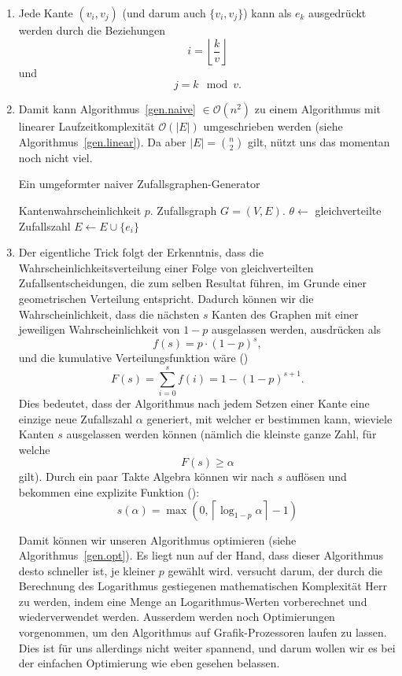 \documentclass[11pt,abstracton]{scrreprt} %
\theoremstyle{definition}
\begin{document}
\begin{enumerate}
\item Jede Kante $(v_i, v_j)$ (und darum auch $\{v_i, v_j\}$) kann als $e_k$ ausgedrückt werden durch die Beziehungen
\[
i = \left\lfloor\frac k v \right\rfloor
\]
und
\[
j = k \mod v.
\]

\item Damit kann Algorithmus~\ref{gen.naive} $\in \mathcal{O}(n^2)$ zu einem Algorithmus mit linearer Laufzeitkomplexität $\mathcal{O}(|E|)$ umgeschrieben werden (siehe Algorithmus~\ref{gen.linear}). Da aber $|E| = \binom{n}{2}$ gilt, nützt uns das momentan noch nicht viel.

\begin{algorithm}
\caption{Ein umgeformter naiver Zufallsgraphen-Generator}
\label{gen.linear}
\begin{algorithmic}
\Require
	\Statex Kantenwahrscheinlichkeit $p$.
\Ensure
	\Statex Zufallsgraph $G = (V, E)$.
\Statex
{}
\State $\theta\gets$ gleichverteilte Zufallszahl
\State $E \gets E \cup \{e_i\}$
\EndIf
\EndFor
\end{algorithmic}
\end{algorithm}

\item Der eigentliche Trick folgt der Erkenntnis, dass die Wahrscheinlichkeitsverteilung einer Folge von gleichverteilten Zufallsentscheidungen, die zum selben Resultat führen, im Grunde einer geometrischen Verteilung entspricht. Dadurch können wir die Wahrscheinlichkeit, dass die nächsten $s$ Kanten des Graphen mit einer jeweiligen Wahrscheinlichkeit von $1-p$ ausgelassen werden, ausdrücken als
\[
	f(s) = p \cdot (1-p)^s,
\]
und die kumulative Verteilungsfunktion wäre (\cite{fastalgo})
\[
	F(s) = \sum\limits_{i=0}^s f(i) = 1 - (1-p)^{s+1}.
\]
Dies bedeutet, dass der Algorithmus nach jedem Setzen einer Kante eine einzige neue Zufallszahl $\alpha$ generiert, mit welcher er bestimmen kann, wieviele Kanten $s$ ausgelassen werden können (nämlich die kleinste ganze Zahl, für welche
\[
F(s) \ge \alpha
\]
gilt). Durch ein paar Takte Algebra können wir nach $s$ auflösen und bekommen eine explizite Funktion (\cite{fastalgo}):
\[
	s(\alpha) = \max(0, \left\lceil \log_{1-p}\alpha\right\rceil - 1)
\]

Damit können wir unseren Algorithmus optimieren (siehe Algorithmus~\ref{gen.opt}). Es liegt nun auf der Hand, dass dieser Algorithmus desto schneller ist, je kleiner $p$ gewählt wird. \cite{fastalgo} versucht darum, der durch die Berechnung des Logarithmus gestiegenen mathematischen Komplexität Herr zu werden, indem eine Menge an Logarithmus-Werten vorberechnet und wiederverwendet werden. Ausserdem werden noch Optimierungen vorgenommen, um den Algorithmus auf Grafik-Prozessoren laufen zu lassen. Dies ist für uns allerdings nicht weiter spannend, und darum wollen wir es bei der einfachen Optimierung wie eben gesehen belassen.


\end{enumerate}
\end{document}
